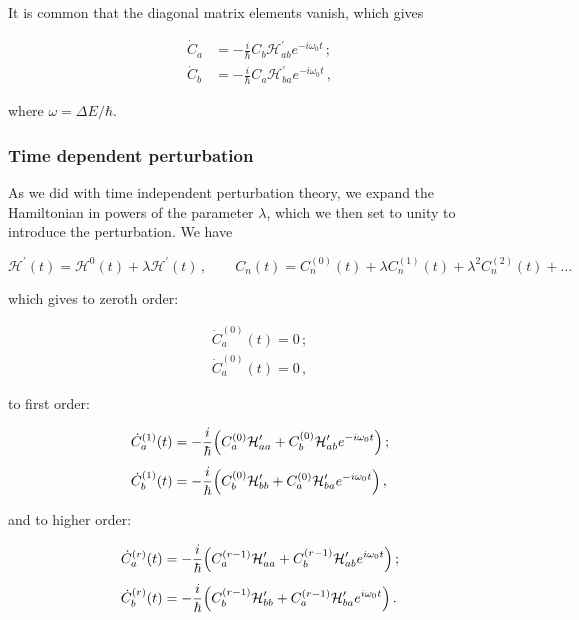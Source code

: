 \documentclass[12pt, titlepage]{article}
\begin{document}
It is common that the diagonal matrix elements vanish, which gives

\begin{align*}
	\dot{C}_a &= -\frac{i}{\hbar} C_b\mathcal{H}^\prime_{ab}e^{-i\omega_0 t} \,; \\[4pt]
	\dot{C}_b &= -\frac{i}{\hbar}C_a\mathcal{H}^\prime_{ba}e^{-i\omega_0 t} \,,
\end{align*}

where $\omega = \Delta E/\hbar$. 

\subsubsection{Time dependent perturbation}
As we did with time independent perturbation theory, we expand the Hamiltonian in powers of the parameter $\lambda$, which we then set to unity to introduce the perturbation. We have

\begin{equation}
	\mathcal{H}^\prime(t) = \mathcal{H}^0(t) + \lambda\mathcal{H}^\prime(t)\,, \qquad C_n(t) = C_n^{(0)}(t) + \lambda C_n^{(1)}(t) + \lambda^2C_n^{(2)}(t) + \ldots
\end{equation}

which gives to zeroth order:

\begin{subequations}
\begin{align}
	\dot{C}_a^{(0)}(t) = 0 \,; \\[4pt]
	\dot{C}_a^{(0)}(t) = 0 \,,
\end{align}
\end{subequations}

to first order:

\begin{subequations}
\begin{align}
	\dot{C}_a^{(1)}(t) &= -\frac{i}{\hbar}\qty(C_a^{(0)}\mathcal{H}^\prime_{aa} + C_b^{(0)}\mathcal{H}^\prime_{ab}e^{-i\omega_0 t}) \,;\\[4pt]
	\dot{C}_b^{(1)}(t) &= -\frac{i}{\hbar}\qty(C_b^{(0)}\mathcal{H}^\prime_{bb} + C_a^{(0)}\mathcal{H}^\prime_{ba}e^{-i\omega_0 t})\,,
\end{align}
\end{subequations}

and to higher order:

\begin{subequations}
\begin{align}
\dot{C}_a^{(r)}(t) &= -\frac{i}{\hbar}\qty(C_{a}^{(r-1)}\mathcal{H}^\prime_{aa} + C_{b}^{(r-1)}\mathcal{H}^\prime_{ab}e^{i\omega_0 t})\,; \\[4pt]
\dot{C}_b^{(r)}(t) &= -\frac{i}{\hbar}\qty(C_{b}^{(r-1)}\mathcal{H}^\prime_{bb} + C_{a}^{(r-1)}\mathcal{H}^\prime_{ba}e^{i\omega_0 t})\,.
\end{align}
\end{subequations}
\end{document}
